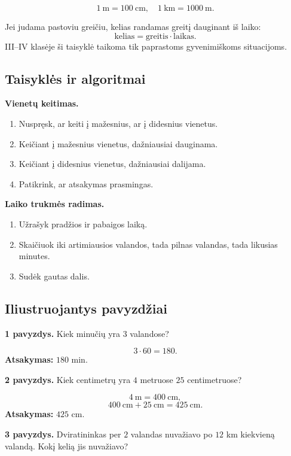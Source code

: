 \begin{savybe}
\[
1\ \text{m}=100\ \text{cm},\quad 1\ \text{km}=1000\ \text{m}.
\]
\end{savybe}

\begin{savybe}
Jei judama pastoviu greičiu, kelias randamas greitį dauginant iš laiko:
\[
\text{kelias}=\text{greitis}\cdot\text{laikas}.
\]
III--IV klasėje ši taisyklė taikoma tik paprastoms gyvenimiškoms situacijoms.
\end{savybe}

\subsection{Taisyklės ir algoritmai}

\textbf{Vienetų keitimas.}
\begin{enumerate}[label=\arabic*.]
\item Nuspręsk, ar keiti į mažesnius, ar į didesnius vienetus.
\item Keičiant į mažesnius vienetus, dažniausiai dauginama.
\item Keičiant į didesnius vienetus, dažniausiai dalijama.
\item Patikrink, ar atsakymas prasmingas.
\end{enumerate}

\textbf{Laiko trukmės radimas.}
\begin{enumerate}[label=\arabic*.]
\item Užrašyk pradžios ir pabaigos laiką.
\item Skaičiuok iki artimiausios valandos, tada pilnas valandas, tada likusias minutes.
\item Sudėk gautas dalis.
\end{enumerate}

\subsection{Iliustruojantys pavyzdžiai}

\textbf{1 pavyzdys.} Kiek minučių yra \(3\) valandose?

\[
3\cdot60=180.
\]
\textbf{Atsakymas:} \(180\) min.

\textbf{2 pavyzdys.} Kiek centimetrų yra \(4\) metruose \(25\) centimetruose?

\[
4\ \text{m}=400\ \text{cm},
\]
\[
400\ \text{cm}+25\ \text{cm}=425\ \text{cm}.
\]
\textbf{Atsakymas:} \(425\) cm.

\textbf{3 pavyzdys.} Dviratininkas per \(2\) valandas nuvažiavo po \(12\) km kiekvieną valandą. Kokį kelią jis nuvažiavo?

